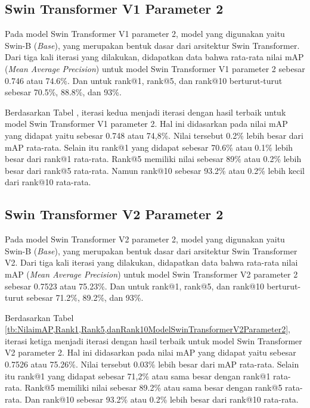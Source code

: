 \subsection{Swin Transformer V1 Parameter 2}

Pada model Swin Transformer V1 parameter 2, model yang digunakan yaitu Swin-B (\emph{Base}), yang merupakan bentuk 
dasar dari arsitektur Swin Transformer. Dari tiga kali iterasi yang dilakukan, didapatkan data bahwa rata-rata nilai 
mAP (\emph{Mean Average Precision}) untuk model Swin Transformer V1 parameter 2 sebesar 0.746 atau 74.6\%. Dan untuk 
rank@1, rank@5, dan rank@10 berturut-turut sebesar 70.5\%, 88.8\%, dan 93\%. 

Berdasarkan Tabel , iterasi kedua menjadi 
iterasi dengan hasil terbaik untuk model Swin Transformer V1 parameter 2. 
Hal ini didasarkan pada nilai mAP yang didapat yaitu sebesar 0.748 atau 74,8\%. Nilai tersebut 0.2\% lebih besar dari 
mAP rata-rata. Selain itu rank@1 yang didapat sebesar 70.6\% atau 0.1\% lebih besar dari rank@1 rata-rata. Rank@5 
memiliki nilai sebesar 89\% atau 0.2\% lebih besar dari rank@5 rata-rata. Namun rank@10 sebesar 93.2\% atau 0.2\% 
lebih kecil dari rank@10 rata-rata.

\subsection{Swin Transformer V2 Parameter 2}

Pada model Swin Transformer V2 parameter 2, model yang digunakan yaitu Swin-B (\emph{Base}), yang merupakan bentuk 
dasar dari arsitektur Swin Transformer V2. Dari tiga kali iterasi yang dilakukan, didapatkan data bahwa rata-rata nilai 
mAP (\emph{Mean Average Precision}) untuk model Swin Transformer V2 parameter 2 sebesar 0.7523 atau 75.23\%. Dan untuk 
rank@1, rank@5, dan rank@10 berturut-turut sebesar 71.2\%, 89.2\%, dan 93\%. 

Berdasarkan Tabel \ref{tb:NilaimAP,Rank1,Rank5,danRank10ModelSwinTransformerV2Parameter2}, iterasi ketiga menjadi 
iterasi dengan hasil terbaik untuk model Swin Transformer V2 parameter 2. 
Hal ini didasarkan pada nilai mAP yang didapat yaitu sebesar 0.7526 atau 75.26\%. Nilai tersebut 0.03\% lebih besar dari 
mAP rata-rata. Selain itu rank@1 yang didapat sebesar 71,2\% atau sama besar dengan rank@1 rata-rata. Rank@5 memiliki 
nilai sebesar 89.2\% atau sama besar dengan rank@5 rata-rata. Dan rank@10 sebesar 93.2\% atau 0.2\% 
lebih besar dari rank@10 rata-rata.

